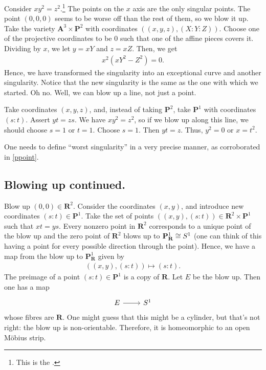 \documentclass [11 pt, oneside] {article}
\begin{document}
\begin{example}\label{ppoint}
Consider $xy^2=z^2$.\footnote{This is the .} The points on the $x$ axis are the only singular points. The point $(0,0,0)$ seems to be worse off than the rest of them, so we blow it up. Take the variety $\mathbf{A}^3 \times \mathbf{P}^2$ with coordinates $((x,y,z),  (X:Y:Z))$. Choose one of the projective coordinates to be $0$ such that one of the affine pieces covers it. Dividing by $x$, we let $y=xY$ and $z=xZ$. Then, we get
\begin{align*}
	x^2(xY^2-Z^2)=0.
\end{align*}
Hence, we have transformed the singularity into an exceptional curve and another singularity. Notice that the new singularity is the same as the one with which we started. Oh no. Well, we can blow up a line, not just a point.

Take coordinates $(x,y,z)$, and, instead of taking $\mathbf{P}^2$, take $\mathbf{P}^1$ with coordinates $(s:t)$. Assert $yt=zs$. We have $xy^2=z^2$, so if we blow up along this line, we should choose $s=1$ or $t=1$. Choose $s=1$. Then $yt=z$. Thus, $y^2=0$ or $x=t^2$.
\end{example}

\begin{warn}
	One needs to define ``worst singularity'' in a very precise manner, as corroborated in \cref{ppoint}. 
\end{warn}

\subsection{Blowing up continued.}
\begin{example}\label{}
Blow up $(0,0)\in  \mathbf{R}^2$. Consider the coordinates $(x,y)$, and introduce new coordinates $(s:t) \in \mathbf{P}^1$. Take the set of points $((x,y), (s:t)) \in \mathbf{R}^2\times \mathbf{P}^1$ such that $xt=ys$. Every nonzero point in $\mathbf{R}^2$ corresponds to a unique point of the blow up and the zero point of $\mathbf{R}^2$ blows up to $\mathbf{P}^1_{\mathbf{R}}\cong S^1$  (one can think of this having a point for every possible direction through the point). Hence, we have a map from the blow up to $\mathbf{P}^1_{\mathbf{R}}$ given by
\begin{align*}
	((x,y),  (s:t)) \longmapsto (s:t).
\end{align*}
The preimage of a point $(s:t) \in \mathbf{P}^1$ is a copy of $\mathbf{R}$. Let $E$ be the blow up. Then one has a map 
\[
\begin{tikzcd}
E\ar[r]& S^1
\end{tikzcd}
\]
 whose fibres are $\mathbf{R}$. One might guess that this might be a cylinder, but that's not right: the blow up is non-orientable. Therefore, it is homeomorphic to an open M\"obius strip. 
\end{example}
\end{document}
